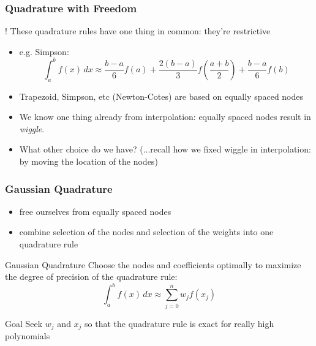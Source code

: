 \documentclass[10pt]{beamer}
\begin{document}
\begin{frame}
\frametitle{Quadrature with Freedom}
\begin{alertblock}{!}
  These quadrature rules have one thing in common: they're restrictive
\end{alertblock}
\vspace{0.5cm}

\begin{itemize}
  \item e.g. Simpson:
    \begin{equation*}
    \int_a^b f(x)\,dx \approx \frac{b-a}{6} f(a) + \frac{2(b-a)}{3}
    f\left(\frac{a+b}{2}\right) + \frac{b-a}{6}f(b)
    \end{equation*}
  \item Trapezoid, Simpson, etc (Newton-Cotes) are based on equally spaced
  nodes
\vspace{0.5cm}

  \item We know one thing already from interpolation: equally spaced nodes
  result in \emph{wiggle}.
  \item What other choice do we have?   (...recall how we fixed wiggle in
interpolation: by moving the location of the nodes)
\end{itemize}
\end{frame}
\begin{frame}
\frametitle{Gaussian Quadrature}
  \begin{itemize}
    \item free ourselves from equally spaced nodes
    \item combine selection of the nodes and selection of the weights into
    one quadrature rule
  \end{itemize}
\begin{block}{Gaussian Quadrature}
    Choose the nodes and coefficients optimally to maximize the degree of
precision of the quadrature rule:
    \begin{equation*}
    \int_a^b f(x)\,dx \approx \sum_{j=0}^n w_j f(x_j)
    \end{equation*}
\end{block}
\begin{alertblock}{Goal}
    Seek $w_j$ and $x_j$ so that the quadrature rule is exact for really high polynomials
\end{alertblock}
\end{frame}
\end{document}
